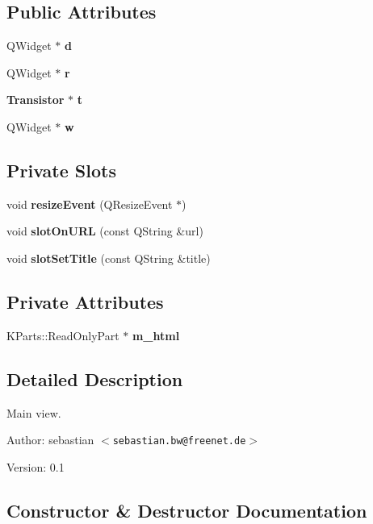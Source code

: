 \subsection*{Public Attributes}
\begin{CompactItemize}
\item 
QWidget $\ast$ {\bf d}
\item 
QWidget $\ast$ {\bf r}
\item 
{\bf Transistor} $\ast$ {\bf t}
\item 
QWidget $\ast$ {\bf w}
\end{CompactItemize}
\subsection*{Private Slots}
\begin{CompactItemize}
\item 
void {\bf resize\-Event} (QResize\-Event $\ast$)
\item 
void {\bf slot\-On\-URL} (const QString \&url)
\item 
void {\bf slot\-Set\-Title} (const QString \&title)
\end{CompactItemize}
\subsection*{Private Attributes}
\begin{CompactItemize}
\item 
KParts::Read\-Only\-Part $\ast$ {\bf m\_\-html}
\end{CompactItemize}


\subsection{Detailed Description}
Main view. 

\begin{Desc}
\item[Author:]sebastian $<${\tt sebastian.bw@freenet.de}$>$ \end{Desc}
\begin{Desc}
\item[Version:]0.1 \end{Desc}




\subsection{Constructor \& Destructor Documentation}
